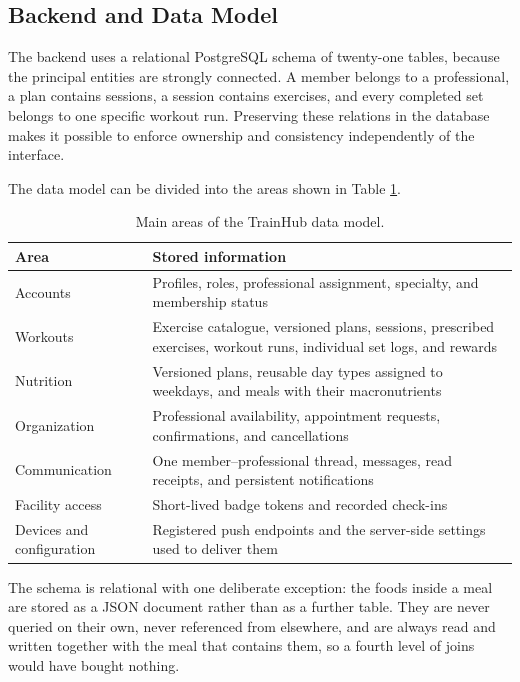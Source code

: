\subsection{Backend and Data Model}\label{subsect:BackendDataModel}

The backend uses a relational PostgreSQL schema of twenty-one tables, because the principal entities are strongly connected. A member belongs to a professional, a plan contains sessions, a session contains exercises, and every completed set belongs to one specific workout run. Preserving these relations in the database makes it possible to enforce ownership and consistency independently of the interface.

The data model can be divided into the areas shown in Table \ref{tab:dataAreas}.

\begin{table}[H]
    \centering
    \small
    \begin{tabularx}{\textwidth}{@{}p{} >{\raggedright\arraybackslash}X@{}}
        \toprule
        \textbf{Area} & \textbf{Stored information} \\
        \midrule
        Accounts & Profiles, roles, professional assignment, specialty, and membership status \\
        Workouts & Exercise catalogue, versioned plans, sessions, prescribed exercises, workout runs, individual set logs, and rewards \\
        Nutrition & Versioned plans, reusable day types assigned to weekdays, and meals with their macronutrients \\
        Organization & Professional availability, appointment requests, confirmations, and cancellations \\
        Communication & One member--professional thread, messages, read receipts, and persistent notifications \\
        Facility access & Short-lived badge tokens and recorded check-ins \\
        Devices and configuration & Registered push endpoints and the server-side settings used to deliver them \\
        \bottomrule
    \end{tabularx}
    \caption{Main areas of the TrainHub data model.}
    \label{tab:dataAreas}
\end{table}

The schema is relational with one deliberate exception: the foods inside a meal are stored as a JSON document rather than as a further table. They are never queried on their own, never referenced from elsewhere, and are always read and written together with the meal that contains them, so a fourth level of joins would have bought nothing.

